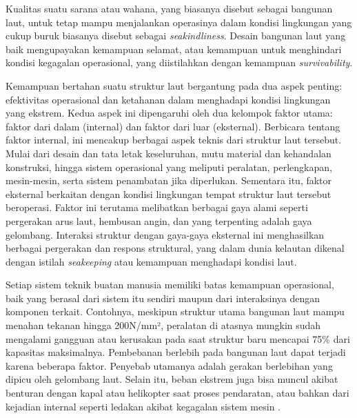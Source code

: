 Kualitas suatu sarana atau wahana, yang biasanya disebut sebagai bangunan laut, untuk tetap mampu menjalankan operasinya dalam kondisi lingkungan yang cukup buruk biasanya disebut sebagai \emph{seakindliness}. Desain bangunan laut yang baik mengupayakan kemampuan selamat, atau kemampuan untuk menghindari kondisi kegagalan operasional, yang diistilahkan dengan kemampuan \emph{survivability}.

Kemampuan bertahan suatu struktur laut bergantung pada dua aspek penting: efektivitas operasional dan ketahanan dalam menghadapi kondisi lingkungan yang ekstrem. Kedua aspek ini dipengaruhi oleh dua kelompok faktor utama: faktor dari dalam (internal) dan faktor dari luar (eksternal).
Berbicara tentang faktor internal, ini mencakup berbagai aspek teknis dari struktur laut tersebut. Mulai dari desain dan tata letak keseluruhan, mutu material dan kehandalan konstruksi, hingga sistem operasional yang meliputi peralatan, perlengkapan, mesin-mesin, serta sistem penambatan jika diperlukan.
Sementara itu, faktor eksternal berkaitan dengan kondisi lingkungan tempat struktur laut tersebut beroperasi. Faktor ini terutama melibatkan berbagai gaya alami seperti pergerakan arus laut, hembusan angin, dan yang terpenting adalah gaya gelombang. Interaksi struktur dengan gaya-gaya eksternal ini menghasilkan berbagai pergerakan dan respons struktural, yang dalam dunia kelautan dikenal dengan istilah \emph{seakeeping} atau kemampuan menghadapi kondisi laut.

Setiap sistem teknik buatan manusia memiliki batas kemampuan operasional, baik yang berasal dari sistem itu sendiri maupun dari interaksinya dengan komponen terkait. Contohnya, meskipun struktur utama bangunan laut mampu menahan tekanan hingga 200N/mm², peralatan di atasnya mungkin sudah mengalami gangguan atau kerusakan pada saat struktur baru mencapai 75\% dari kapasitas maksimalnya.
Pembebanan berlebih pada bangunan laut dapat terjadi karena beberapa faktor. Penyebab utamanya adalah gerakan berlebihan yang dipicu oleh gelombang laut. Selain itu, beban ekstrem juga bisa muncul akibat benturan dengan kapal atau helikopter saat proses pendaratan, atau bahkan dari kejadian internal seperti ledakan akibat kegagalan sistem mesin \citep{Djatmiko_2012}.

